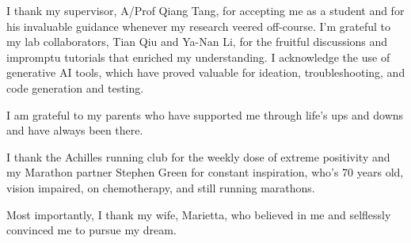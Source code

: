 I thank my supervisor, A/Prof Qiang Tang, for accepting me as a student and for his invaluable guidance whenever my research veered off-course. I'm grateful to my lab collaborators, Tian Qiu and Ya-Nan Li, for the fruitful discussions and impromptu tutorials that enriched my understanding. I acknowledge the use of generative AI tools, which have proved valuable for ideation, troubleshooting, and code generation and testing.

I am grateful to my parents who have supported me through life's ups and downs and have always been there.

I thank the Achilles running club for the weekly dose of extreme positivity and my Marathon partner Stephen Green for constant inspiration, who's 70 years old, vision impaired, on chemotherapy, and still running marathons.

Most importantly, I thank my wife, Marietta, who believed in me and selflessly convinced me to pursue my dream.